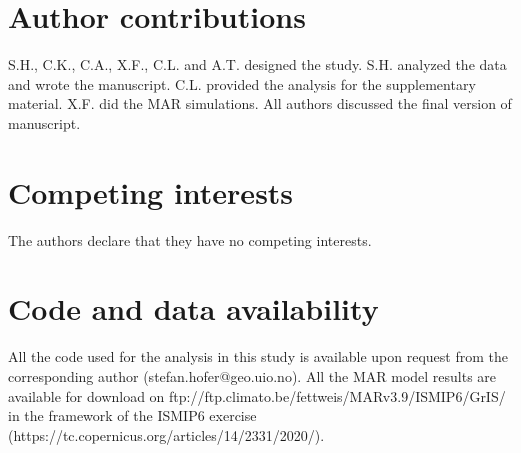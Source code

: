 \documentclass[12pt]{article}
\begin{document}
\section*{Author contributions}

S.H., C.K., C.A., X.F., C.L. and A.T. designed the study. S.H. analyzed the data and wrote the manuscript. C.L. provided the analysis for the supplementary material. X.F. did the MAR simulations. All authors discussed the final version of manuscript.

\section*{Competing interests}
The authors declare that they have no competing interests.

\section*{Code and data availability}

%
All the code used for the analysis in this study is available upon request from the corresponding author (stefan.hofer@geo.uio.no). All the MAR model results are available for download on ftp://ftp.climato.be/fettweis/MARv3.9/ISMIP6/GrIS/ in the framework of the ISMIP6 exercise (https://tc.copernicus.org/articles/14/2331/2020/).
\end{document}
